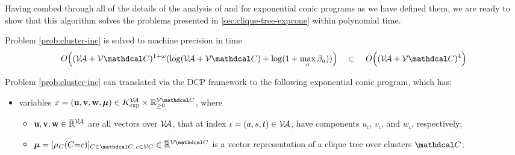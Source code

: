 \documentclass[twoside]{article}
\begin{document}
Having combed through all of the details of the analysis of  \textcite{badenbroek2021algorithm} and \textcite{nesterov1996infeasible} for exponential
conic programs as we have defined them, we are ready to show that this algorithm solves the problems presented in \cref{sec:clique-tree-expcone} within polynomial time. 

\begin{lemma}\label{lem:cluster-inc-polytime}
Problem \eqref{prob:cluster-inc} is solved to machine precision in time
\[
    O\Big( (\V\!\Ar + \V\mathdcal C)^{1 + \omega} ( \log (\V\!\Ar + \V\mathdcal C) 
        + \log(1+ \max_a\beta_a)) \Big)
    \quad \subset \quad
        \tilde O\Big( (\V\!\Ar + \V\mathdcal C)^4 \Big)
\]
\end{lemma}
\begin{lproof}
    Problem \eqref{prob:cluster-inc}
    can translated via the DCP framework to 
    the following exponential conic program, which has:
    \begin{itemize}[label=$\blacktriangleright$]
    \item variables 
        $x = (\mat u, \mat v, \mat w, \bmu) \in K_{\exp}^{\V\!\Ar} \times \mathbb R_{\ge 0}^{\V \mathdcal C}$, 
        where 
        \begin{itemize}[label=\textbullet]
        \item $\mathbf{u, v,w} \in \mskip1mu\overline{\mskip-1mu\mathbb R\!}\,^{\mathcal V\!\mathcal A}$
            are all vectors over $\mathcal V\!\mathcal A$,
            that at index $\iota = (a,s,t) \in \mathcal V\!\mathcal A$, have 
            components $u_\iota$, $v_\iota$, and $w_\iota$, respectively;
        \item
            $\bmu = [\mu_{C}(C{=}c)]_%
            {C \in \mathdcal C,\,c \in\V C}
             \in \Rext^{\V \mathdcal C}$ is a vector representation of a clique tree over clusters $\mathdcal C$;
    \end{itemize}


\end{itemize}
\end{lproof}
\end{document}
